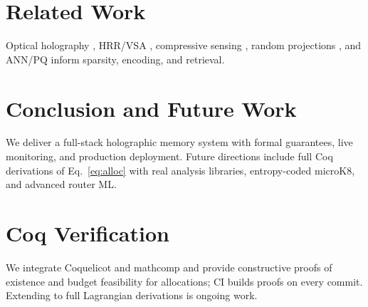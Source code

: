 \documentclass[conference]{IEEEtran}
\begin{document}
\section{Related Work}
Optical holography \cite{gabor1948,goodman2017,born1999}, HRR/VSA \cite{plate1995,kanerva2009}, compressive sensing \cite{donoho2006,candes2008}, random projections \cite{johnson1984,achlioptas2003}, and ANN/PQ \cite{jegou2011} inform sparsity, encoding, and retrieval.

\section{Conclusion and Future Work}
We deliver a full-stack holographic memory system with formal guarantees, live monitoring, and production deployment. Future directions include full Coq derivations of Eq.~\eqref{eq:alloc} with real analysis libraries, entropy-coded microK8, and advanced router ML.

\section{Coq Verification}\label{sec:coq}
We integrate Coquelicot and mathcomp and provide constructive proofs of existence and budget feasibility for allocations; CI builds proofs on every commit. Extending to full Lagrangian derivations is ongoing work.



\end{document}
